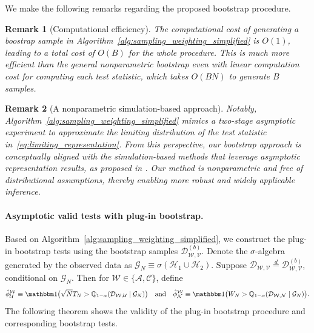 \documentclass[12pt]{article}
\newtheorem{remark}{Remark}
\newcommand{\indicator}{\mathbbm 1}						%
\begin{document}
We make the following remarks regarding the proposed bootstrap procedure.

\begin{remark}[Computational efficiency]
	The computational cost of generating a boostrap sample in Algorithm~\ref{alg:sampling_weighting_simplified} is $O(1)$, leading to a total cost of $O(B)$ 
	for the whole procedure. This is much more efficient than the general nonparametric bootstrap
	even with linear computation cost for computing each test statistic, which takes $O(BN)$ 
	to generate $B$ samples.
\end{remark}

\begin{remark}[A nonparametric simulation-based approach]
	Notably, Algorithm~\ref{alg:sampling_weighting_simplified} mimics a two-stage asymptotic experiment to approximate the limiting distribution of the test statistic in~\eqref{eq:limiting_representation}. From this perspective, our bootstrap approach is conceptually aligned with the simulation-based methods that leverage asymptotic representation results, as proposed in \citet{Hirano2023}. Our method is nonparametric and free of distributional assumptions, thereby enabling more robust and widely applicable inference.
\end{remark}
\paragraph{Asymptotic valid tests with plug-in bootstrap.}

Based on Algorithm~\ref{alg:sampling_weighting_simplified}, we construct the plug-in bootstrap tests using the bootstrap samples $\mathcal{D}_{\mathcal{W},\mathcal{V}}^{(b)}$. Denote the $\sigma$-algebra generated by the observed data as $\mathcal{G}_N\equiv \sigma(\mathcal{H}_1\cup\mathcal{H}_2)$. Suppose $\mathcal{D}_{\mathcal{W},\mathcal{V}}\overset{d}{=}\mathcal{D}_{\mathcal{W},\mathcal{V}}^{(b)}$, conditional on $\mathcal{G}_N$. Then for $\mathcal{W} \in \{\mathcal{A}, \mathcal{C}\}$, define
\[
\hat{\phi}_{\mathcal{U}}^{\mathcal{W}} \equiv \indicator\big(\sqrt{N} T_N > \mathbb{Q}_{1 - \alpha}(\mathcal{D}_{\mathcal{W}, \mathcal{U}}\mid \mathcal{G}_N)\big)\quad\text{and}\quad 
\hat{\phi}_{\mathcal{N}}^{\mathcal{W}} \equiv \indicator\big(W_N > \mathbb{Q}_{1 - \alpha}(\mathcal{D}_{\mathcal{W},\mathcal{N}}\mid \mathcal{G}_N)\big).
\]
The following theorem shows the validity of the plug-in bootstrap procedure and corresponding bootstrap tests. 
\end{document}
